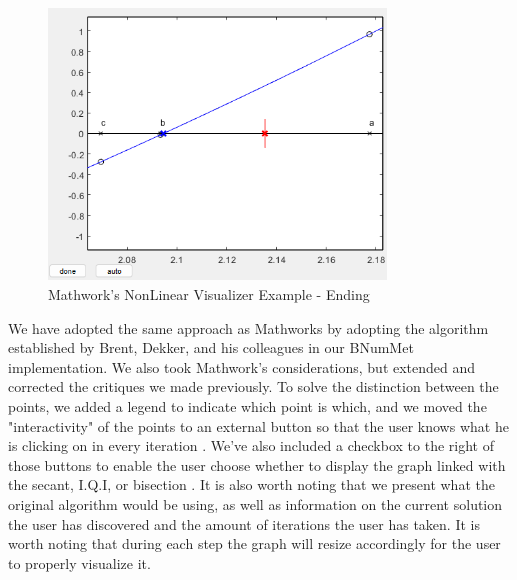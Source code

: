\begin{figure}[H]
    \centering
    \includegraphics[width=0.8\textwidth]{Include/Images/Thesis/Development/Visualizers/NON LINEAR VISUALIZER/Mathworks.NonLinear.Ex1.1.png}
    \caption{Mathwork's \cite{doi:10.1137/1.9780898717952} NonLinear Visualizer Example - Ending}
    \label{fig:Mathwork's NonLinear Visualizer Example - Ending}
\end{figure}

We have adopted the same approach as Mathworks by adopting the algorithm established by Brent, Dekker, and his colleagues in our BNumMet implementation. We also took Mathwork's considerations, but extended and corrected the critiques we made previously. To solve the distinction between the points, we added a legend to indicate which point is which, and we moved the "interactivity" of the points to an external button so that the user knows what he is clicking on in every iteration . We've also included a checkbox to the right of those buttons to enable the user choose whether to display the graph linked with the secant, I.Q.I, or bisection . It is also worth noting that we present what the original algorithm would be using, as well as information on the current solution the user has discovered and the amount of iterations the user has taken. It is worth noting that during each step the graph will resize accordingly for the user to properly visualize it. 


